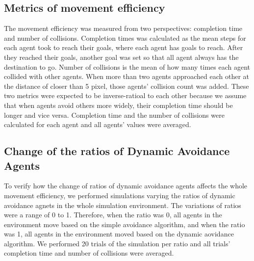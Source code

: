 \documentclass[letterpaper, 10 pt, conference]{ieeeconf}  %
\begin{document}
\subsection{Metrics of movement efficiency}
The movement efficiency was measured from two perspectives: completion time and number of collisions. Completion times was calculated as the mean steps for each agent took to reach their goals, where each agent has goals to reach. After they reached their goals, another goal was set so that all agent always has the destination to go. Number of collisions is the mean of how many times each agent collided with other agents. When more than two agents approached each other at the distance of closer than 5 pixel, those agents' collision count was added. These two metrics were expected to be inverse-ratioal to each other because we assume that when agents avoid others more widely, their completion time should be longer and vice versa. Completion time and the number of collisions were calculated for each agent and all agents' values were averaged.

\subsection{Change of the ratios of Dynamic Avoidance Agents}
To verify how the change of ratios of dynamic avoidance agents affects the whole movement efficiency, we performed simulations varying the ratios of dynamic avoidance agnets in the whole simulation environment. The variations of ratios were a range of 0 to 1. Therefore, when the ratio was 0, all agents in the environment move based on the simple avoidance algorithm, and when the ratio was 1, all agents in the environment moved based on the dynamic aovidance algorithm. We performed 20 trials of the simulation per ratio and all trials' completion time and number of collisions were averaged.
\end{document}
